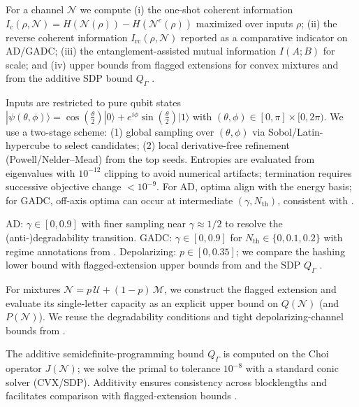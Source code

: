 \documentclass[11pt]{article}
\theoremstyle{plain}
\theoremstyle{definition}
\numberwithin{equation}{section}
\begin{document}
For a channel $\mathcal N$ we compute (i) the one-shot coherent information $I_{\mathrm c}(\rho,\mathcal N)=H(\mathcal N(\rho))-H(\mathcal N^c(\rho))$ maximized over inputs $\rho$; (ii) the reverse coherent information $I_{\mathrm{rc}}(\rho,\mathcal N)$ reported as a comparative indicator on AD/GADC; (iii) the entanglement-assisted mutual information $I(A;B)$ for scale; and (iv) upper bounds from flagged extensions for convex mixtures \cite{FKG20,22} and from the additive SDP bound $Q_\Gamma$ \cite{Wang19}. %


Inputs are restricted to pure qubit states $|\psi(\theta,\phi)\rangle=\cos(\tfrac{\theta}{2})|0\rangle+e^{i\phi}\sin(\tfrac{\theta}{2})|1\rangle$ with $(\theta,\phi)\in[0,\pi]\times[0,2\pi)$. We use a two-stage scheme: (1) global sampling over $(\theta,\phi)$ via Sobol/Latin-hypercube to select candidates; (2) local derivative-free refinement (Powell/Nelder–Mead) from the top seeds. Entropies are evaluated from eigenvalues with $10^{-12}$ clipping to avoid numerical artifacts; termination requires successive objective change $<10^{-9}$. For AD, optima align with the energy basis; for GADC, off-axis optima can occur at intermediate $(\gamma,N_{\mathrm{th}})$, consistent with \cite{Khatri20}. 


AD: $\gamma\in[0,0.9]$ with finer sampling near $\gamma\!\approx\!1/2$ to resolve the (anti-)degradability transition. GADC: $\gamma\in[0,0.9]$ for $N_{\mathrm{th}}\in\{0,0.1,0.2\}$ with regime annotations from \cite{Khatri20}. Depolarizing: $p\in[0,0.35]$; we compare the hashing lower bound with flagged-extension upper bounds from \cite{FKG20,22} and the SDP $Q_\Gamma$ \cite{Wang19}. 


For mixtures $\mathcal N=p\,\mathcal U+(1-p)\,\mathcal M$, we construct the flagged extension and evaluate its single-letter capacity as an explicit upper bound on $Q(\mathcal N)$ (and $P(\mathcal N)$). We reuse the degradability conditions and tight depolarizing-channel bounds from \cite{FKG20,22}. 


The additive semidefinite-programming bound $Q_\Gamma$ is computed on the Choi operator $J(\mathcal N)$; we solve the primal to tolerance $10^{-8}$ with a standard conic solver (CVX/SDP). Additivity ensures consistency across blocklengths and facilitates comparison with flagged-extension bounds \cite{Wang19}. 
\end{document}
